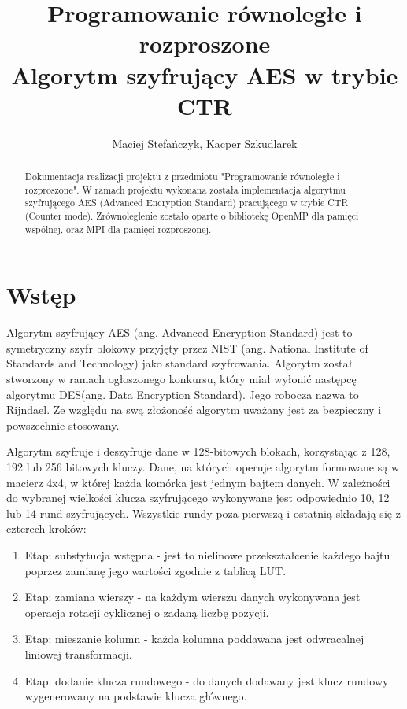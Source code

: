 \documentclass[a4paper,12pt]{article}
\begin{document}
\title{{\small Programowanie równoległe i rozproszone}\\Algorytm szyfrujący AES w trybie CTR}
\author{Maciej Stefańczyk, Kacper Szkudlarek}

\maketitle

\begin{abstract}
Dokumentacja realizacji projektu z przedmiotu "Programowanie równoległe i rozproszone". W ramach projektu wykonana została implementacja algorytmu szyfrującego AES (Advanced Encryption Standard) pracującego w trybie CTR (Counter mode). Zrównoleglenie zostało oparte o bibliotekę OpenMP dla pamięci wspólnej, oraz MPI dla pamięci rozproszonej.
\end{abstract}


\section{Wstęp}
Algorytm szyfrujący AES (ang. Advanced Encryption Standard) jest to symetryczny szyfr blokowy przyjęty przez NIST (ang. National Institute of Standards and Technology) jako standard szyfrowania. Algorytm został stworzony w ramach ogłoszonego konkursu, który miał wyłonić następcę algorytmu DES(ang. Data Encryption Standard). Jego robocza nazwa to Rijndael. Ze względu na swą złożoność algorytm uważany jest za bezpieczny i powszechnie stosowany. 

Algorytm szyfruje i deszyfruje dane w 128-bitowych blokach, korzystając z 128, 192 lub 256 bitowych kluczy. Dane, na których operuje algorytm formowane są w macierz 4x4, w której każda komórka jest jednym bajtem danych. W zależności do wybranej wielkości klucza szyfrującego wykonywane jest odpowiednio 10, 12 lub 14 rund szyfrujących. Wszystkie rundy poza pierwszą i ostatnią składają się z czterech kroków:
\begin{enumerate}
\item Etap: substytucja wstępna  - jest to nielinowe przekształcenie każdego bajtu poprzez zamianę jego wartości zgodnie z tablicą LUT.
\item Etap: zamiana wierszy - na każdym wierszu danych wykonywana jest operacja rotacji cyklicznej o zadaną liczbę pozycji.
\item Etap: mieszanie kolumn - każda kolumna poddawana jest odwracalnej liniowej transformacji.
\item Etap: dodanie klucza rundowego - do danych dodawany jest klucz rundowy wygenerowany na podstawie klucza głównego.
\end{enumerate}
\end{document}
